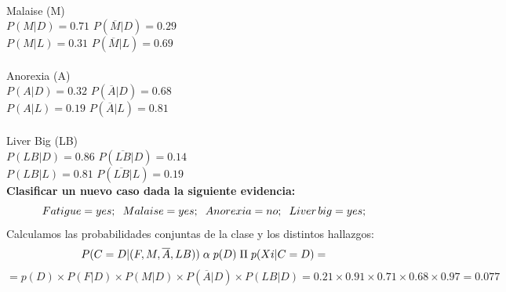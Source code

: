 \documentclass[es]{ifirak}
\begin{document}
\paragraph{}
Malaise (M)\\
$P( M | D ) = 0.71$ \hspace{2.5cm}	$P(\overline{M} | D ) = 0. 29$\\
$P( M | L) = 0.31$ \hspace{2.5cm}	$P(\overline{M} | L ) = 0.69$\\
\paragraph{}
Anorexia (A)\\
$P(A  | D) = 0.32$ \hspace{2.5cm}	$P(\overline{A} | D ) = 0.68$\\
$P(A | L ) = 0.19$ \hspace{2.5cm}	$P(\overline{A} | L ) = 0.81$\\
\paragraph{}
Liver Big (LB)\\
$P(LB | D) = 0.86$	\hspace{2.5cm}  $P(\overline{LB} | D ) = 0.14$\\
$P(LB | L) = 0.81$  \hspace{2.5cm}  $P(\overline{LB} | L) = 0.19$\\

\textbf{Clasificar un nuevo caso dada la siguiente evidencia:}\\
$$ Fatigue = yes;\hspace{0.2cm} Malaise = yes;\hspace{0.2cm} Anorexia = no;\hspace{0.2cm} Liver\hspace{0.05cm} big = yes;$$
Calculamos las probabilidades conjuntas de la clase y los distintos hallazgos:\\
\begin{displaymath}
 P (C = D | ( F , M ,\overline{A} , LB) )\hspace{0.1cm}  \alpha \hspace{0.1cm}  p(D)\hspace{0.1cm} \Pi \hspace{0.1cm}p( Xi | C = D) =
\end{displaymath}
\begin{displaymath}
= p(D)\times P(F | D )\times P( M | D )\times P(\overline{A}  | D ) \times P(LB | D) = 0.21 \times 0.91 \times 0.71 \times 0.68 \times 0.97 = 0.077
\end{displaymath}
\end{document}

